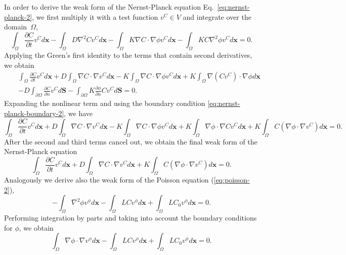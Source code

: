 In order to derive the weak form of the Nernst-Planck equation Eq.~\eqref{eq:nernst-planck-2},
we first multiply it with a test function $v^C \in V$ and integrate over the domain~$\Omega$,
\begin{equation}
  \int_{\Omega}\frac{\partial C}{\partial t}v^C d\mathbf{x}
  -\int_{\Omega}D\nabla^2Cv^C d\mathbf{x}-\int_{\Omega}K\nabla C\cdot
  \nabla\phi v^C d\mathbf{x} - \int_{\Omega}KC\nabla^2\phi v^C d\mathbf{x}=0.
  \label{eq:nernst-planck-weak1}
\end{equation}
Applying the Green's first identity to the terms that contain second derivatives,
we obtain
\begin{eqnarray}
 && \int_{\Omega}\frac{\partial C}{\partial t}v^C d\mathbf{x}+
  D\int_{\Omega}\nabla C\cdot\nabla v^C d\mathbf{x}-
  K\int_{\Omega}\nabla C \cdot \nabla \phi v^C d\mathbf{x}+
  K\int_{\Omega}\nabla\left(Cv^C\right)\cdot \nabla \phi d\mathbf{x}\\
  &&-D\int_{\partial\Omega}\frac{\partial C}{\partial n}v^C d\mathbf{S}-
  \int_{\partial\Omega}K\frac{\partial\phi}{\partial n}Cv^C d\mathbf{S}=0.
  \label{eq:nernst-planck-weak2}
\end{eqnarray}
Expanding the nonlinear term and using the boundary condition 
\eqref{eq:nernst-planck-boundary-2}, we have
\begin{equation}
  \int_{\Omega}\frac{\partial C}{\partial t}v^C d\mathbf{x}+
  D\int_{\Omega}\nabla C \cdot \nabla v^C d\mathbf{x}-
  K\int_{\Omega}\nabla C \cdot \nabla \phi v^C d\mathbf{x}+
  K\int_{\Omega}\nabla \phi \cdot \nabla C v^C d\mathbf{x}+
  K\int_{\Omega} C \left(\nabla\phi\cdot\nabla v^C\right) d\mathbf{x}=0.
  \label{eq:nernst-planck-weak3}
\end{equation}
After the second and third terms cancel out, we obtain the final weak form of 
the Nernst-Planck equation
\begin{equation}
  \int_{\Omega}\frac{\partial C}{\partial t}v^C d\mathbf{x}+
  D\int_{\Omega}\nabla C \cdot \nabla v^C d\mathbf{x}+
  K\int_{\Omega} C \left(\nabla\phi\cdot\nabla v^C\right) d\mathbf{x}=0.
  \label{eq:nernst-planck-weak-final}
\end{equation}
Analogously we derive also the weak form of the Poisson equation (\ref{eq:poisson-2}),
\begin{equation}
  -\int_{\Omega}\nabla^2\phi v^\phi d\mathbf{x}-\int_{\Omega}LCv^\phi d\mathbf{x}+
  \int_{\Omega}LC_{0}v^\phi d\mathbf{x}=0.
  \label{eq:poisson-weak1}
\end{equation}
Performing integration by parts and taking into account the boundary 
conditions for $\phi$, we obtain
\begin{equation}
  \int_{\Omega}\nabla\phi\cdot\nabla v^\phi d\mathbf{x}-\int_{\Omega}LCv^\phi d\mathbf{x}+
  \int_{\Omega}LC_{0}v^\phi d\mathbf{x}=0.
  \label{eq:poisson-weak-final}
\end{equation}


